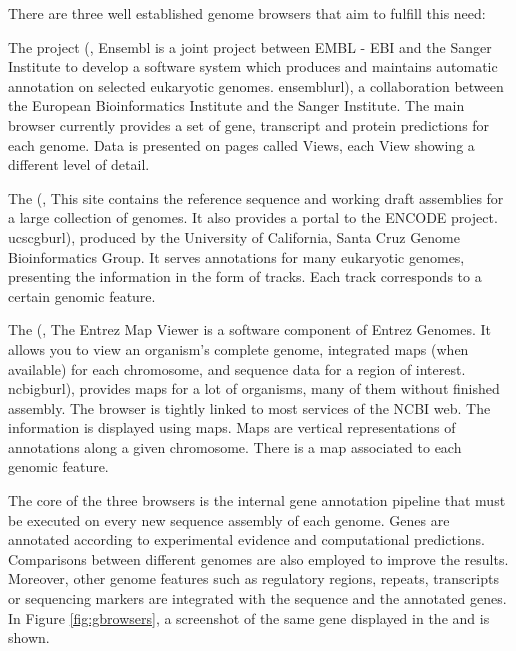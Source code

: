 \noindent There are three well established genome browsers that aim to fulfill this need:

\begin{mitemize}
\item
The \ensembl{} project  
(\citealp{birney:2004a}, %
    {\ensembl{}}%
    {%
    Ensembl is a joint project between EMBL - EBI and the 
	Sanger Institute  to develop a software system which produces 
	and maintains automatic annotation on selected eukaryotic genomes.
    }%
    {ensemblurl}), %
a collaboration between the European Bioinformatics Institute and the Sanger Institute.
The main browser currently provides a set of gene, transcript and protein predictions for each
genome. Data is presented on pages called Views, each View showing a different level of detail.

\item
The \ucscgb{}  
(\citealp{karolchik:2003a}, %
    {\ucscgb{}}%
    {%
	  This site contains the reference sequence and working draft assemblies for a 
	  large collection of genomes. It also provides a portal to the ENCODE project.
    }%
    {ucscgburl}), %
produced by the University of California, Santa Cruz Genome Bioinformatics Group. 
It serves annotations for many eukaryotic genomes, presenting the information in the 
form of tracks. Each track corresponds to a certain genomic feature. 

\item
The \ncbimv{} 
(\citealp{wheeler:2005a}, %
    {\ncbimv{}}%
    {%
    The Entrez Map Viewer is a software component of Entrez Genomes. It allows you to 
	view an organism's complete genome, integrated maps (when available) for each chromosome, 
	and sequence data for a region of interest.
    }%
    {ncbigburl}), %
provides maps for a lot of organisms, many of them without finished assembly. The browser 
is tightly linked to most services of the NCBI web. The information is displayed using  
maps. Maps are vertical representations of annotations along a given chromosome. There is a 
map associated to each genomic feature.

\end{mitemize}

The core of the three browsers is the internal gene annotation pipeline that must be executed on
every new sequence assembly of each genome. Genes are annotated according to experimental 
evidence and computational predictions. Comparisons between different genomes are also employed to 
improve the results. Moreover, other genome features such as regulatory regions, repeats, transcripts
or sequencing markers are integrated with the sequence and the annotated genes. In Figure 
\ref{fig:gbrowsers}, a screenshot of the same gene displayed in the \ucscgb{} and \ensembl{} is shown.

